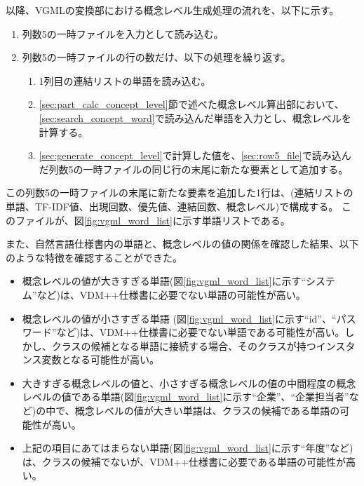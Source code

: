以降、VGMLの変換部における概念レベル生成処理の流れを、以下に示す。

\begin{enumerate}
    \item 列数5の一時ファイルを入力として読み込む。
    \label{sec:row5_file}
    \item 列数5の一時ファイルの行の数だけ、以下の処理を繰り返す。
        \begin{enumerate}
            \item 1列目の連結リストの単語を読み込む。
            \label{sec:search_concept_word}
            \item \ref{sec:part_calc_concept_level}節で述べた概念レベル算出部において、\ref{sec:search_concept_word}で読み込んだ単語を入力とし、概念レベルを計算する。
            \label{sec:generate_concept_level}
            \item \ref{sec:generate_concept_level}で計算した値を、\ref{sec:row5_file}で読み込んだ列数5の一時ファイルの同じ行の末尾に新たな要素として追加する。
        \end{enumerate}
\end{enumerate}

この列数5の一時ファイルの末尾に新たな要素を追加した1行は、(連結リストの単語、TF-IDF値、出現回数、優先値、連結回数、概念レベル)で構成する。
このファイルが、図\ref{fig:vgml_word_list}に示す単語リストである。

また、自然言語仕様書内の単語と、概念レベルの値の関係を確認した結果、以下のような特徴を確認することができた。

\begin{itemize}
    \item 概念レベルの値が大きすぎる単語(図\ref{fig:vgml_word_list}に示す``システム''など)は、VDM++仕様書に必要でない単語の可能性が高い。
    \item 概念レベルの値が小さすぎる単語 (図\ref{fig:vgml_word_list}に示す``id''、``パスワード''など)は、VDM++仕様書に必要でない単語である可能性が高い。しかし、クラスの候補となる単語に接続する場合、そのクラスが持つインスタンス変数となる可能性が高い。
    \item 大きすぎる概念レベルの値と、小さすぎる概念レベルの値の中間程度の概念レベルの値である単語(図\ref{fig:vgml_word_list}に示す``企業''、``企業担当者''など)の中で、概念レベルの値が大きい単語は、クラスの候補である単語の可能性が高い。
    \item 上記の項目にあてはまらない単語(図\ref{fig:vgml_word_list}に示す``年度''など)は、クラスの候補でないが、VDM++仕様書に必要である単語の可能性が高い。
\end{itemize}

